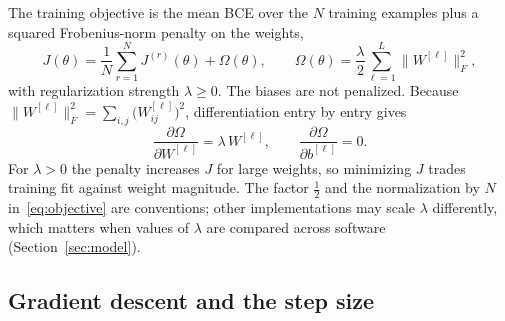 The training objective is the mean BCE over the $N$ training examples plus a squared Frobenius-norm penalty on the weights,
\begin{equation}
  J(\theta)=\frac{1}{N}\sum_{r=1}^{N}J^{(r)}(\theta)+\Omega(\theta),\qquad
  \Omega(\theta)=\frac{\lambda}{2}\sum_{\ell=1}^{L}\bigl\lVert W^{[\ell]}\bigr\rVert_F^{2},
  \label{eq:objective}
\end{equation}
with regularization strength $\lambda\ge 0$. The biases are not penalized. Because $\lVert W^{[\ell]}\rVert_F^{2}=\sum_{i,j}\bigl(W^{[\ell]}_{ij}\bigr)^{2}$, differentiation entry by entry gives
\begin{equation}
  \frac{\partial\Omega}{\partial W^{[\ell]}}=\lambda\,W^{[\ell]},\qquad \frac{\partial\Omega}{\partial b^{[\ell]}}=0 .
  \label{eq:reggrad}
\end{equation}
For $\lambda>0$ the penalty increases $J$ for large weights, so minimizing $J$ trades training fit against weight magnitude. The factor $\tfrac12$ and the normalization by $N$ in~\eqref{eq:objective} are conventions; other implementations may scale $\lambda$ differently, which matters when values of $\lambda$ are compared across software (Section~\ref{sec:model}).

\subsection{Gradient descent and the step size}
\label{sec:prelim-gd}

